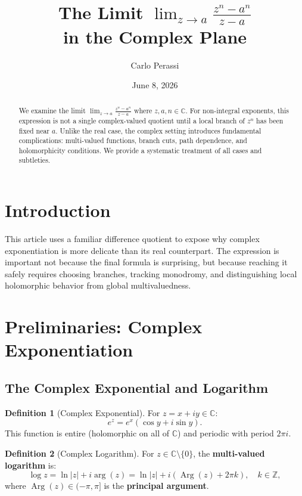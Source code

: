\documentclass{article}
\title{The Limit $\displaystyle\lim_{z \to a} \frac{z^n - a^n}{z - a}$ \\ in the Complex Plane}
\author{Carlo Perassi}
\date{June 8, 2026}
\theoremstyle{definition}
\newtheorem{definition}{Definition}[section]
\theoremstyle{remark}
\newcommand{\C}{\mathbb{C}}
\newcommand{\Z}{\mathbb{Z}}
\newcommand{\Arg}{\operatorname{Arg}}
\begin{document}
\maketitle

\begin{abstract}
We examine the limit $\lim_{z \to a} \frac{z^n - a^n}{z - a}$ where $z, a, n \in \C$. For non-integral exponents, this expression is not a single complex-valued quotient until a local branch of $z^n$ has been fixed near $a$. Unlike the real case, the complex setting introduces fundamental complications: multi-valued functions, branch cuts, path dependence, and holomorphicity conditions. We provide a systematic treatment of all cases and subtleties.
\end{abstract}

\section{Introduction}

This article uses a familiar difference quotient to expose why complex
exponentiation is more delicate than its real counterpart. The expression is
important not because the final formula is surprising, but because reaching it
safely requires choosing branches, tracking monodromy, and distinguishing local
holomorphic behavior from global multivaluedness.

\tableofcontents

\section{Preliminaries: Complex Exponentiation}

\subsection{The Complex Exponential and Logarithm}

\begin{definition}[Complex Exponential]
For $z = x + iy \in \C$:
\begin{equation}
e^z = e^x(\cos y + i \sin y).
\end{equation}
This function is entire (holomorphic on all of $\C$) and periodic with period $2\pi i$.
\end{definition}

\begin{definition}[Complex Logarithm]
For $z \in \C \setminus \{0\}$, the \textbf{multi-valued logarithm} is:
\begin{equation}
\log z = \ln|z| + i \arg(z) = \ln|z| + i(\Arg(z) + 2\pi k), \quad k \in \Z,
\end{equation}
where $\Arg(z) \in (-\pi, \pi]$ is the \textbf{principal argument}.
\end{definition}
\end{document}
